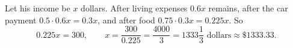 Let his income be $x$ dollars. After living expenses $0.6x$ remains, after the car payment $0.5\cdot0.6x=0.3x$, and after food $0.75\cdot0.3x=0.225x$. So
\[
0.225x=300,\qquad x=\dfrac{300}{0.225}=\dfrac{4000}{3}=\boxed{1333\dfrac{1}{3}\text{ dollars}}\approx\$1333.33 .
\]
